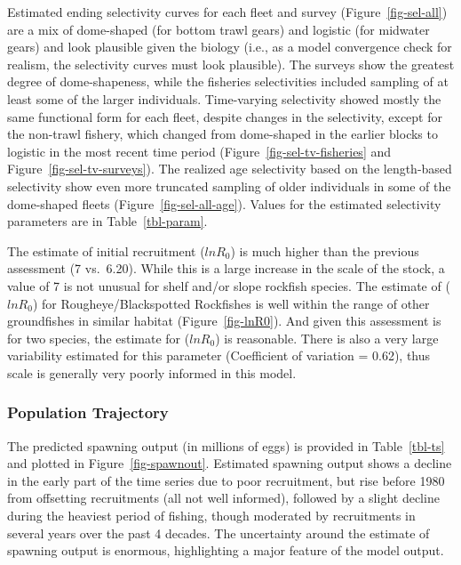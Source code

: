 \documentclass[
]{scrartcl}
\begin{document}
Estimated ending selectivity curves for each fleet and survey
(Figure~\ref{fig-sel-all}) are a mix of dome-shaped (for bottom trawl
gears) and logistic (for midwater gears) and look plausible given the
biology (i.e., as a model convergence check for realism, the selectivity
curves must look plausible). The surveys show the greatest degree of
dome-shapeness, while the fisheries selectivities included sampling of
at least some of the larger individuals. Time-varying selectivity showed
mostly the same functional form for each fleet, despite changes in the
selectivity, except for the non-trawl fishery, which changed from
dome-shaped in the earlier blocks to logistic in the most recent time
period (Figure~\ref{fig-sel-tv-fisheries} and
Figure~\ref{fig-sel-tv-surveys}). The realized age selectivity based on
the length-based selectivity show even more truncated sampling of older
individuals in some of the dome-shaped fleets
(Figure~\ref{fig-sel-all-age}). Values for the estimated selectivity
parameters are in Table~\ref{tbl-param}.

The estimate of initial recruitment (\(lnR_0\)) is much higher than the
previous assessment (7 vs.~6.20). While this is a large increase in the
scale of the stock, a value of 7 is not unusual for shelf and/or slope
rockfish species. The estimate of (\(lnR_0\)) for Rougheye/Blackspotted
Rockfishes is well within the range of other groundfishes in similar
habitat (Figure~\ref{fig-lnR0}). And given this assessment is for two
species, the estimate for (\(lnR_0\)) is reasonable. There is also a
very large variability estimated for this parameter (Coefficient of
variation = 0.62), thus scale is generally very poorly informed in this
model.

\subsubsection{Population Trajectory}\label{population-trajectory}

The predicted spawning output (in millions of eggs) is provided in
Table~\ref{tbl-ts} and plotted in Figure~\ref{fig-spawnout}. Estimated
spawning output shows a decline in the early part of the time series due
to poor recruitment, but rise before 1980 from offsetting recruitments
(all not well informed), followed by a slight decline during the
heaviest period of fishing, though moderated by recruitments in several
years over the past 4 decades. The uncertainty around the estimate of
spawning output is enormous, highlighting a major feature of the model
output.
\end{document}
